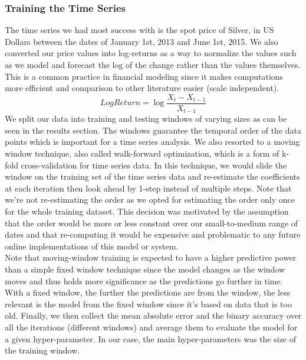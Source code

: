 \subsubsection{Training the Time Series}
The time series we had most success with is the spot price of Silver, in US Dollars between the dates of January 1st, 2013 and June 1st, 2015. We also converted our price values into log-returns as a way to normalize the values such as we model and forecast the log of the change rather than the values themselves. This is a common practice in financial modeling since it makes computations more efficient and comparison to other literature easier (scale independent). \cite{tsay} \\
$$LogReturn = \log{\frac{X_t - X_{t-1}}{X_{t-1}}}$$
We split our data into training and testing windows of varying sizes as can be seen in the results section. The windows guarantee the temporal order of the data points which is important for a time series analysis. We also resorted to a moving window technique, also called walk-forward optimization, which is a form of k-fold cross-validation for time series data. In this technique, we would slide the window on the training set of the time series data and re-estimate the coefficients at each iteration then look ahead by 1-step instead of multiple steps. Note that we're not re-estimating the order as we opted for estimating the order only once for the whole training dataset. This decision was motivated by the assumption that the order would be more or less constant over our small-to-medium range of dates and that re-computing it would be expensive and problematic to any future online implementations of this model or system.\\
Note that moving-window training is expected to have a higher predictive power than a simple fixed window technique since the model changes as the window moves and thus holds more significance as the predictions go further in time. With a fixed window, the further the predictions are from the window, the less relevant is the model from the fixed window since it's based on data that is too old.
Finally, we then collect the mean absolute error and the binary accuracy over all the iterations (different windows) and average them to evaluate the model for a given hyper-parameter. In our case, the main hyper-parameters was the size of the training window.\\

